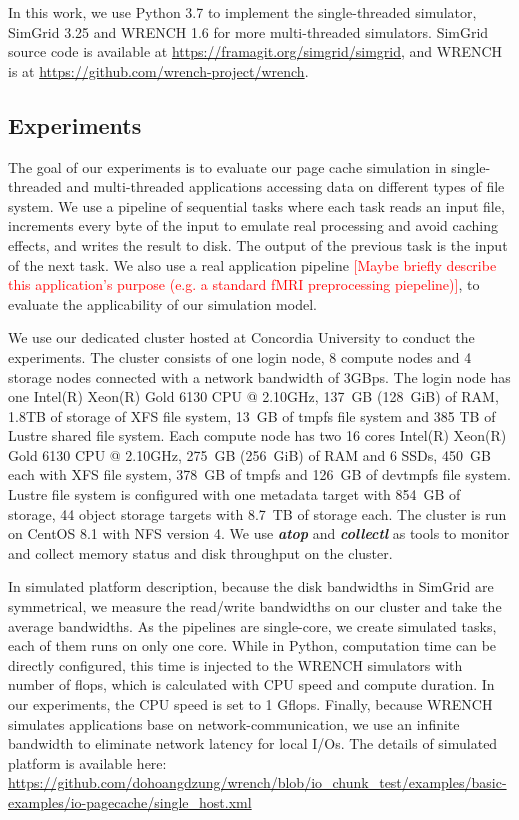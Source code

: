 \documentclass[conference]{IEEEtran}
\begin{document}
			In this work, we use Python 3.7 to implement the single-threaded simulator, 
			SimGrid 3.25 and WRENCH 1.6 for more multi-threaded simulators. 
			SimGrid source code is available at \url{https://framagit.org/simgrid/simgrid}, 
			and WRENCH is at \url{https://github.com/wrench-project/wrench}.
			
		\subsection{Experiments}
		
        	The goal of our experiments is to evaluate our page cache 
			simulation in single-threaded and multi-threaded applications
			accessing data on different types of file system. We use a pipeline
			of sequential tasks where each task reads an input file, increments
			every byte of the input to emulate real processing and avoid caching
			effects, and writes the result to disk. The output of the previous
			task is the input of the next task. We also use a real application 
            pipeline \textcolor{red}{[Maybe briefly describe this application's purpose (e.g. a standard fMRI preprocessing piepeline)]}, to evaluate the applicability of our simulation model. 
			
			We use our dedicated cluster hosted at Concordia University to conduct 
			the experiments. The cluster consists of one login node, 8 compute nodes 
			and 4 storage nodes connected with a network bandwidth of 3GBps. 
			The login node has one Intel(R) Xeon(R) Gold 6130 CPU @ 2.10GHz, 
			137~GB (128~GiB) of RAM, 1.8TB of storage of XFS file system, 
			13~GB of tmpfs file system and 385 TB of Lustre shared file system. 
			Each compute node has two 16 cores Intel(R) Xeon(R) Gold 6130 CPU @ 2.10GHz, 
			275~GB (256~GiB) of RAM and 6 SSDs, 450~GB each with XFS file system, 
			378~GB of tmpfs and 126~GB of devtmpfs file system.
			Lustre file system is configured with one metadata target with 854~GB 
			of storage, 44 object storage targets with 8.7~TB of storage each. 
			The cluster is run on CentOS 8.1 with NFS version 4. 
			We use \textbf{\textit{atop}} and \textbf{\textit{collectl}} as tools to 
			monitor and collect memory status and disk throughput 
			on the cluster. 
			
			In simulated platform description, because the disk bandwidths in SimGrid 
			are symmetrical, we measure the read/write bandwidths on our cluster and 
			take the average bandwidths. 
			As the pipelines are single-core, we create simulated tasks, 
			each of them runs on only one core. 
			While in Python, computation time can be directly configured, 
			this time is injected to the WRENCH simulators with number of flops, 
			which is calculated with CPU speed and compute duration. 
			In our experiments, the CPU speed is set to 1 Gflops. 
			Finally, because WRENCH simulates applications base on network-communication, 
			we use an infinite bandwidth to eliminate network latency for local I/Os.
			The details of simulated platform is available here: 
			\url{https://github.com/dohoangdzung/wrench/blob/io_chunk_test/examples/basic-examples/io-pagecache/single_host.xml}
			
\end{document}
